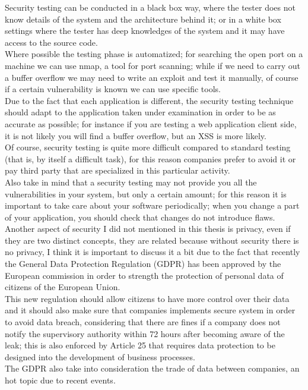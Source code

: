 Security testing can be conducted in a black box way, where the tester does not know details of the system and the architecture behind it; or
in a white box settings where the tester has deep knowledges of the system and it may have access to the source code.\\
Where possible the testing phase is automatized; for searching the open port on a machine we can use nmap, a tool for port scanning; while if we
need to carry out a buffer overflow we may need to write an exploit and test it manually, of course if a certain vulnerability is known 
we can use specific tools.\\
Due to the fact that each application is different, the security testing technique should adapt to the application taken under examination in order
to be as accurate as possible; for instance if you are testing a web application client side, it is not likely you will find a buffer overflow, but 
an XSS is more likely.\\

Of course, security testing is quite more difficult compared to standard testing (that is, by itself a difficult task), for this reason companies prefer to avoid it or pay third party that are specialized in this particular activity.\\
Also take in mind that a security testing may not provide you all the vulnerabilities in your system, but only a certain amount; for this reason it
is important to take care about your software periodically; when you change a part of your application, you should check that changes do not
introduce flaws.\\

Another aspect of security I did not mentioned in this thesis is privacy, even if they are two distinct concepts, they are related because without security there is no privacy, I think it is important to discuss it a bit due to the fact that recently the General Data Protection Regulation (GDPR)
has been approved by the European commission in order to strength the protection of personal data of citizens of the European Union.\\
This new regulation should allow citizens to have more control over their data and it should also make sure that companies implements secure system
in order to avoid data breach, considering that there are fines if a company does not notify the supervisory authority within 72 hours after becoming aware of the leak; this is also enforced by Article 25 that requires data protection to be designed into the development of business processes\cite{wikica}.\\
The GDPR also take into consideration the trade of data between companies, an hot topic due to recent events\cite{ca}.\\


